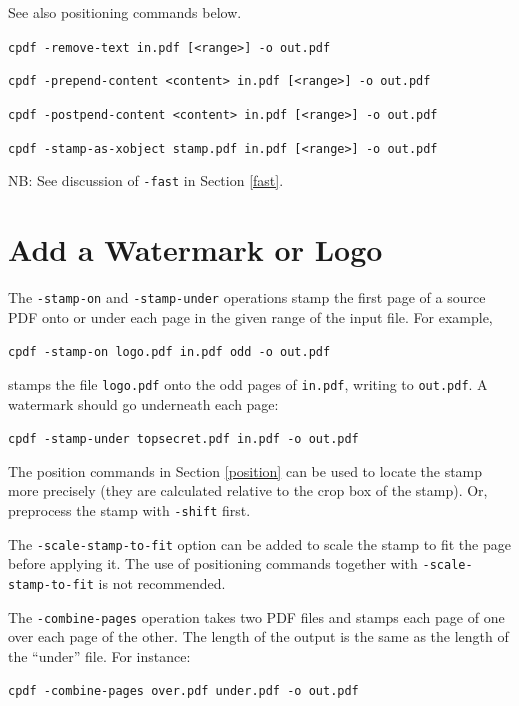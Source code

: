 \documentclass{book}
\begin{document}
\begin{framed}
  \vspace{1.5mm}
  \noindent See also positioning commands below.

  \vspace{1.5mm}
  \noindent\small\verb!cpdf -remove-text in.pdf [<range>] -o out.pdf!

  \vspace{1.5mm}
  \noindent\small\verb!cpdf -prepend-content <content> in.pdf [<range>] -o out.pdf!

  \vspace{1.5mm}
  \noindent\small\verb!cpdf -postpend-content <content> in.pdf [<range>] -o out.pdf!

  \vspace{1.5mm}
  \noindent\small\verb!cpdf -stamp-as-xobject stamp.pdf in.pdf [<range>] -o out.pdf!

  \vspace{1.5mm}
  \noindent\small NB: See discussion of \texttt{-fast} in Section \ref{fast}.
  \end{framed}

  \section{Add a Watermark or Logo}
  The \texttt{-stamp-on} and \texttt{-stamp-under} operations stamp the first
page of a source PDF onto or under each page in the given range of the input
file. For example,
  \begin{framed}
    \noindent\small\verb!cpdf -stamp-on logo.pdf in.pdf odd -o out.pdf!
  \end{framed}
\noindent stamps the file \texttt{logo.pdf} onto the odd pages of \texttt{in.pdf},
writing to \texttt{out.pdf}. A watermark should go underneath each page:
  \begin{framed}
    \noindent\small\verb!cpdf -stamp-under topsecret.pdf in.pdf -o out.pdf!
  \end{framed}

\noindent The position commands in Section \ref{position} can be used to locate the stamp more precisely (they are calculated relative to the crop box of the stamp). Or, preprocess the stamp with \texttt{-shift} first.

The \texttt{-scale-stamp-to-fit} option can be added to scale the stamp to fit the page before applying it. The use of positioning commands together with \texttt{-scale-stamp-to-fit} is not recommended.

  The \texttt{-combine-pages} operation takes two PDF files and stamps each
page of one over each page of the other. The length of the output is the same
as the length of the ``under'' file. For instance:
  \begin{framed}
    \noindent\small\verb!cpdf -combine-pages over.pdf under.pdf -o out.pdf!
  \end{framed}
\end{document}

